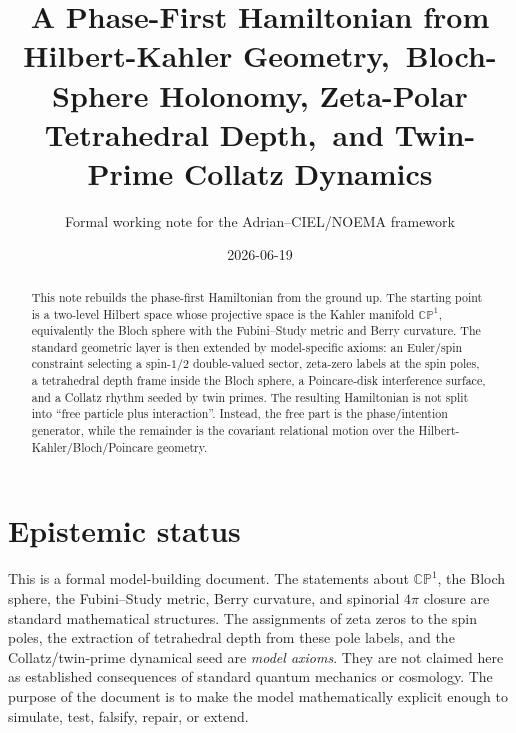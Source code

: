 \documentclass[11pt,a4paper]{article}
\title{A Phase-First Hamiltonian from Hilbert-Kahler Geometry,\ Bloch-Sphere Holonomy, Zeta-Polar Tetrahedral Depth,\ and Twin-Prime Collatz Dynamics}
\author{Formal working note for the Adrian--CIEL/NOEMA framework}
\date{2026-06-19}
\begin{document}
\maketitle

\begin{abstract}
This note rebuilds the phase-first Hamiltonian from the ground up.  The starting point is a two-level Hilbert space whose projective space is the Kahler manifold $\mathbb{CP}^{1}$, equivalently the Bloch sphere with the Fubini--Study metric and Berry curvature.  The standard geometric layer is then extended by model-specific axioms: an Euler/spin constraint selecting a spin-$1/2$ double-valued sector, zeta-zero labels at the spin poles, a tetrahedral depth frame inside the Bloch sphere, a Poincare-disk interference surface, and a Collatz rhythm seeded by twin primes.  The resulting Hamiltonian is not split into ``free particle plus interaction''.  Instead, the free part is the phase/intention generator, while the remainder is the covariant relational motion over the Hilbert-Kahler/Bloch/Poincare geometry.
\end{abstract}

\section*{Epistemic status}
This is a formal model-building document.  The statements about $\mathbb{CP}^{1}$, the Bloch sphere, the Fubini--Study metric, Berry curvature, and spinorial $4\pi$ closure are standard mathematical structures.  The assignments of zeta zeros to the spin poles, the extraction of tetrahedral depth from these pole labels, and the Collatz/twin-prime dynamical seed are \emph{model axioms}.  They are not claimed here as established consequences of standard quantum mechanics or cosmology.  The purpose of the document is to make the model mathematically explicit enough to simulate, test, falsify, repair, or extend.

\tableofcontents
\newpage
\end{document}
